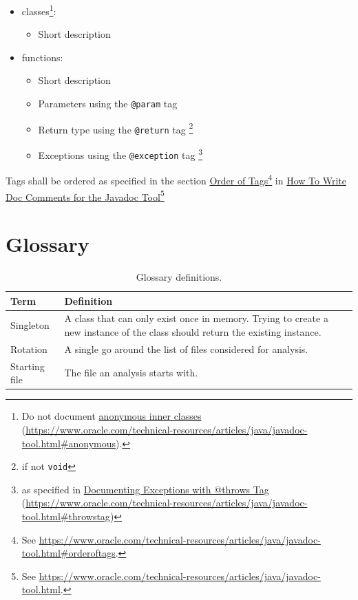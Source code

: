 \documentclass[11pt]{article} %
\begin{document}
    \begin{itemize}
        \item[] classes\footnote{Do not document \href{https://www.oracle.com/technical-resources/articles/java/javadoc-tool.html#anonymous}{anonymous inner classes} (\url{https://www.oracle.com/technical-resources/articles/java/javadoc-tool.html#anonymous}).}:
        \begin{itemize}
            \item Short description
        \end{itemize}
        \item[] functions:
        \begin{itemize}
            \item Short description
            \item Parameters using the \verb|@param| tag
            \item Return type using the \verb|@return| tag \footnote{if not \verb|void|}
            \item Exceptions using the \verb|@exception| tag \footnote{as specified in \href{https://www.oracle.com/technical-resources/articles/java/javadoc-tool.html#throwstag}{Documenting Exceptions with @throws Tag} (\url{https://www.oracle.com/technical-resources/articles/java/javadoc-tool.html#throwstag})}
        \end{itemize}
    \end{itemize}

    Tags shall be ordered as specified in the section \href{https://www.oracle.com/technical-resources/articles/java/javadoc-tool.html#orderoftags}{Order of Tags}\footnote{See \url{https://www.oracle.com/technical-resources/articles/java/javadoc-tool.html#orderoftags}.} in \href{https://www.oracle.com/technical-resources/articles/java/javadoc-tool.html}{How To Write Doc Comments for the Javadoc Tool}\footnote{See \url{https://www.oracle.com/technical-resources/articles/java/javadoc-tool.html}.}

    \newpage


    \section{Glossary}

    \begin{table}[H]
        \centering
        \begin{tabular}{p{.3\linewidth} | p{.6\linewidth}}
            \textbf{Term} & \textbf{Definition}
            \\\hline
            Singleton & A class that can only exist once in memory. Trying to create a new instance of the class
            should return the existing instance. \\\hline
            Rotation      & A single go around the list of files considered for analysis. \\\hline
            Starting file & The file an analysis starts with.
        \end{tabular}
        \caption{Glossary definitions.}
        \label{tab:glossary}
    \end{table}
    \printbibliography[heading=bibintoc]
    \listoffigures
    \listoftables
\end{document}
